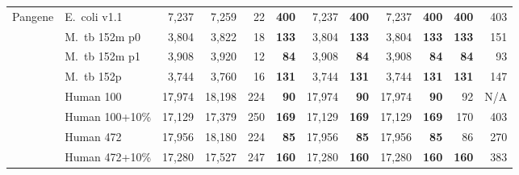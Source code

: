 \begin{table}[ht]
\begin{adjustbox}{max width=\linewidth}
\begin{tabular}{l l r r r r r r r r r r}
\hline
\multirow{8}{*}{\textsf{Pangene}} & \textsf{E.~coli v1.1} & 7,237 & 7,259 & 22 & \textbf{400} & 7,237 & \textbf{400} & 7,237 & \textbf{400} & \textbf{400} & 403 \\
 & \textsf{M.~tb 152m p0} & 3,804 & 3,822 & 18 & \textbf{133} & 3,804 & \textbf{133} & 3,804 & \textbf{133} & \textbf{133} & 151 \\
 & \textsf{M.~tb 152m p1} & 3,908 & 3,920 & 12 & \textbf{84} & 3,908 & \textbf{84} & 3,908 & \textbf{84} & \textbf{84} & 93 \\
 & \textsf{M.~tb 152p} & 3,744 & 3,760 & 16 & \textbf{131} & 3,744 & \textbf{131} & 3,744 & \textbf{131} & \textbf{131} & 147 \\
 & \textsf{Human 100} & 17,974 & 18,198 & 224 & \textbf{90} & 17,974 & \textbf{90} & 17,974 & \textbf{90} & 92 & N/A \\
 & \textsf{Human 100+10\%} & 17,129 & 17,379 & 250 & \textbf{169} & 17,129 & \textbf{169} & 17,129 & \textbf{169} & 170 & 403 \\
 & \textsf{Human 472} & 17,956 & 18,180 & 224 & \textbf{85} & 17,956 & \textbf{85} & 17,956 & \textbf{85} & 86 & 270 \\
 & \textsf{Human 472+10\%} & 17,280 & 17,527 & 247 & \textbf{160} & 17,280 & \textbf{160} & 17,280 & \textbf{160} & \textbf{160} & 383 \\
\bottomrule
\end{tabular}
\end{adjustbox}
\end{table}
